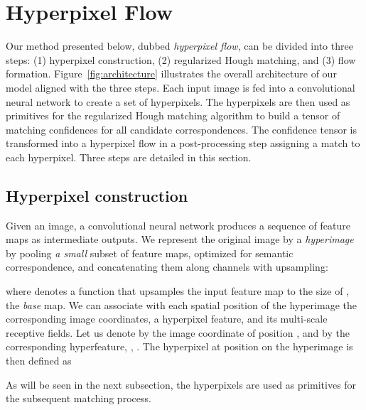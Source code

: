 \documentclass[10pt,twocolumn,letterpaper]{article}
\begin{document}
 

\section{Hyperpixel Flow}




Our method presented below, dubbed {\em hyperpixel flow}, can be divided into three steps: (1) hyperpixel construction, (2) regularized Hough matching, and (3) flow formation. Figure~\ref{fig:architecture} illustrates the overall architecture of our model aligned with the three steps. Each input image is fed into a convolutional neural network to create a set of hyperpixels. The hyperpixels are then used as primitives for the regularized Hough matching algorithm to build a tensor of matching confidences for all candidate correspondences. 
The confidence tensor is transformed into a hyperpixel flow in a post-processing step assigning a match to each hyperpixel.  
Three steps are detailed in this section. 

\subsection{Hyperpixel construction}
Given an image, a convolutional neural network produces a sequence of  feature maps  as intermediate outputs. We represent the original image by a {\em hyperimage} by pooling {\em a small} subset of  feature maps, optimized for semantic correspondence, and concatenating them along channels with upsampling: 

where  denotes a function that upsamples the input feature map to the size of , the {\em base} map. 
We can associate with each spatial position  of the hyperimage the corresponding image coordinates, a hyperpixel feature, and its multi-scale receptive fields.
Let us denote by  the image coordinate of position , and by   the corresponding hyperfeature, \ie, .
The hyperpixel at position  on the hyperimage is then defined as   

As will be seen in the next subsection, the hyperpixels are used as primitives for the subsequent matching process. 
\end{document}
